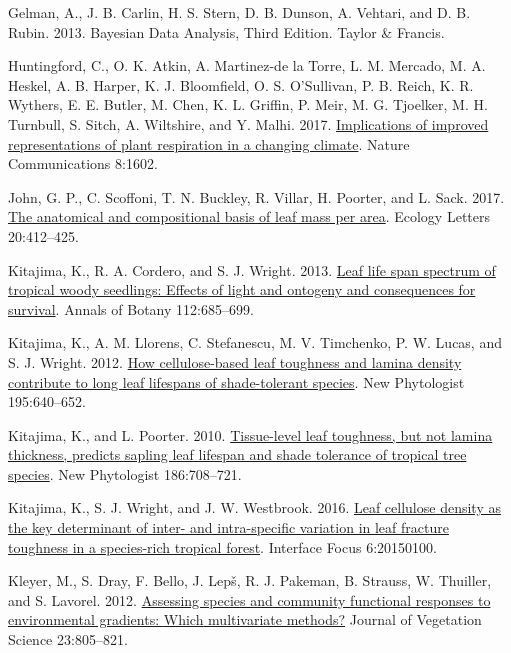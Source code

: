 \documentclass[
  12pt,
  a4paper,
,tablecaptionabove
]{scrartcl}
\newlength{\cslhangindent}
\newenvironment{CSLReferences}[2] %
 {%
  \setlength{\parindent}{0pt}
  \ifodd #1 \everypar{\setlength{\hangindent}{\cslhangindent}}\ignorespaces\fi
  \ifnum #2 > 0
  \setlength{\parskip}{#2\baselineskip}
  \fi
 }%
 {}
\begin{document}
\begin{CSLReferences}{1}{0}
\leavevmode{}%
Gelman, A., J. B. Carlin, H. S. Stern, D. B. Dunson, A. Vehtari, and D.
B. Rubin. 2013. Bayesian {Data Analysis}, {Third Edition}. {Taylor \&
Francis}.

\leavevmode{}%
Huntingford, C., O. K. Atkin, A. Martinez-de la Torre, L. M. Mercado, M.
A. Heskel, A. B. Harper, K. J. Bloomfield, O. S. O'Sullivan, P. B.
Reich, K. R. Wythers, E. E. Butler, M. Chen, K. L. Griffin, P. Meir, M.
G. Tjoelker, M. H. Turnbull, S. Sitch, A. Wiltshire, and Y. Malhi. 2017.
\href{https://doi.org/10.1038/s41467-017-01774-z}{Implications of
improved representations of plant respiration in a changing climate}.
Nature Communications 8:1602.

\leavevmode{}%
John, G. P., C. Scoffoni, T. N. Buckley, R. Villar, H. Poorter, and L.
Sack. 2017. \href{https://doi.org/10.1111/ele.12739}{The anatomical and
compositional basis of leaf mass per area}. Ecology Letters 20:412--425.

\leavevmode{}%
Kitajima, K., R. A. Cordero, and S. J. Wright. 2013.
\href{https://doi.org/10.1093/aob/mct036}{Leaf life span spectrum of
tropical woody seedlings: {Effects} of light and ontogeny and
consequences for survival}. Annals of Botany 112:685--699.

\leavevmode{}%
Kitajima, K., A. M. Llorens, C. Stefanescu, M. V. Timchenko, P. W.
Lucas, and S. J. Wright. 2012.
\href{https://doi.org/10.1111/j.1469-8137.2012.04203.x}{How
cellulose-based leaf toughness and lamina density contribute to long
leaf lifespans of shade-tolerant species}. New Phytologist 195:640--652.

\leavevmode{}%
Kitajima, K., and L. Poorter. 2010.
\href{https://doi.org/10.1111/j.1469-8137.2010.03212.x}{Tissue-level
leaf toughness, but not lamina thickness, predicts sapling leaf lifespan
and shade tolerance of tropical tree species}. New Phytologist
186:708--721.

\leavevmode{}%
Kitajima, K., S. J. Wright, and J. W. Westbrook. 2016.
\href{https://doi.org/10.1098/rsfs.2015.0100}{Leaf cellulose density as
the key determinant of inter- and intra-specific variation in leaf
fracture toughness in a species-rich tropical forest}. Interface Focus
6:20150100.

\leavevmode{}%
Kleyer, M., S. Dray, F. Bello, J. Lepš, R. J. Pakeman, B. Strauss, W.
Thuiller, and S. Lavorel. 2012.
\href{https://doi.org/10.1111/j.1654-1103.2012.01402.x}{Assessing
species and community functional responses to environmental gradients:
{Which} multivariate methods?} Journal of Vegetation Science
23:805--821.


\end{CSLReferences}
\end{document}

